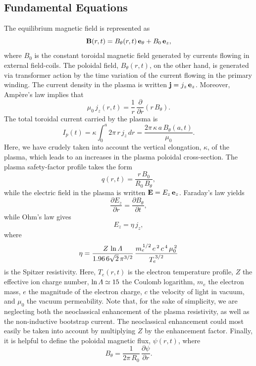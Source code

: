 \documentclass[12pt,prb,aps]{revtex4-1}
\begin{document}
\subsection{Fundamental Equations}
The equilibrium magnetic field is represented as
\begin{equation}
{\bf B}(r,t) = B_\theta(r,t)\,{\bf e}_\theta+ B_0\,{\bf e}_z,
\end{equation}
where $B_0$ is the constant toroidal magnetic field generated by  currents flowing in external  field-coils. The poloidal field, $B_\theta(r,t)$, on the other hand, is generated
via transformer action by the time variation of the current flowing in the primary winding. The current density in the plasma is written ${\bf j}= j_z\,{\bf e}_z$. Moreover, Amp\`{e}re's law implies that
\begin{equation}
\mu_0\,j_z(r,t) = \frac{1}{r}\,\frac{\partial}{\partial r}(r\,B_\theta).
\end{equation}
The total toroidal current carried by the plasma is
\begin{equation}
I_p(t)= \kappa\int_0^a 2\pi\,r\,j_z\,dr = \frac{2\pi\,\kappa\,a\,B_\theta(a,t)}{\mu_0}.
\end{equation}
Here, we have crudely taken into account the vertical elongation, $\kappa$, of the plasma, which leads to an increases in the plasma poloidal cross-section. 
The plasma safety-factor profile takes the form 
\begin{equation}
q(r,t) = \frac{r\,B_0}{R_0\,B_\theta},
\end{equation}
while the electric field in the plasma is written ${\bf E}= E_z\,{\bf e}_z$. Faraday's law yields
\begin{equation}
\frac{\partial E_z}{\partial r} = \frac{\partial B_\theta}{\partial t},
\end{equation}
while Ohm's law gives
\begin{equation}
E_z = \eta\,j_z,
\end{equation}
where
\begin{equation}
\eta = \frac{Z\,\ln{\mit\Lambda}}{1.96\,6\sqrt{2}\,\pi^{3/2}}\,\frac{m_e^{\,1/2}\,e^{\,2}\,c^{\,4}\,\mu_0^{\,2}}{T_e^{\,3/2}}
\end{equation}
is the Spitzer resistivity.\cite{spitzer,fitz} Here, $T_e(r,t)$ is the electron temperature profile, $Z$ the effective ion charge number, $\ln{\mit\Lambda}\simeq 15$ the
Coulomb logarithm, $m_e$ the electron mass, $e$ the magnitude of the electron charge, $c$ the velocity of light in vacuum, and
$\mu_0$ the vacuum permeability. Note that, for the sake of simplicity, we are neglecting both the neoclassical enhancement of the plasma resistivity, as well as 
the non-inductive bootstrap current.\cite{fitz1} The neoclassical  enhancement could most easily be taken into account by multiplying $Z$
 by the enhancement factor. Finally, it is helpful to define the poloidal magnetic flux, $\psi(r,t)$, where 
\begin{equation}
B_\theta =  \frac{1}{2\pi\,R_0}\,\frac{\partial\psi}{\partial r}.
\end{equation}
\end{document}
